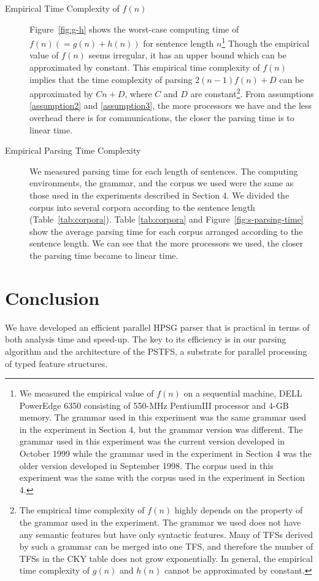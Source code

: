 \begin{description}
\item [Empirical Time Complexity of $f(n)$] Figure~\ref{fig:g-h} shows
the worst-case computing time of $f(n)(= g(n)+h(n))$ for sentence
length $n$\footnote{We measured the empirical value of $f(n)$ on a
sequential machine, DELL PowerEdge 6350 consisting of 550-MHz
PentiumIII processor and 4-GB memory.  The grammar used in this
experiment was the same grammar used in the experiment in Section 4,
but the grammar version was different.  The grammar used in this
experiment was the current version developed in October 1999 while the
grammar used in the experiment in Section 4 was the older version
developed in September 1998.  The corpus used in this experiment was
the same with the corpus used in the experiment in Section 4.}  Though
the empirical value of $f(n)$ seems irregular, it has an upper bound
which can be approximated by constant.  This empirical time complexity
of $f(n)$ implies that the time complexity of parsing $2(n-1)f(n) +D$
can be approximated by $Cn + D$, where $C$ and $D$ are
constant\footnote{The empirical time complexity of $f(n)$ highly
depends on the property of the grammar used in the experiment.  The
grammar we used does not have any semantic features but have only
syntactic features.  Many of TFSs derived by such a grammar can be
merged into one TFS, and therefore the number of TFSs in the CKY table
does not grow exponentially.  In general, the empirical time
complexity of $g(n)$ and $h(n)$ cannot be approximated by constant.}.
From assumptions \ref{assumption2} and \ref{assumption3}, the more
processors we have and the less overhead there is for communications,
the closer the parsing time is to linear time.

\item [Empirical Parsing Time Complexity] We measured parsing time for
each length of sentences.  The computing environments, the grammar,
and the corpus we used were the same as those used in the experiments
described in Section 4.  We divided the corpus into several corpora
according to the sentence length (Table~\ref{tab:corpora}).  Table
\ref{tab:corpora} and Figure~\ref{fig:s-parsing-time} show the average
parsing time for each corpus arranged according to the sentence
length.  We can see that the more processors we used, the closer the
parsing time became to linear time.
\end{description}

\section{Conclusion}
  We have developed an efficient parallel HPSG parser that is
practical in terms of both analysis time and speed-up.  The key to its
efficiency is in our parsing algorithm and the architecture of the PSTFS,
a substrate for parallel processing of typed feature structures.

